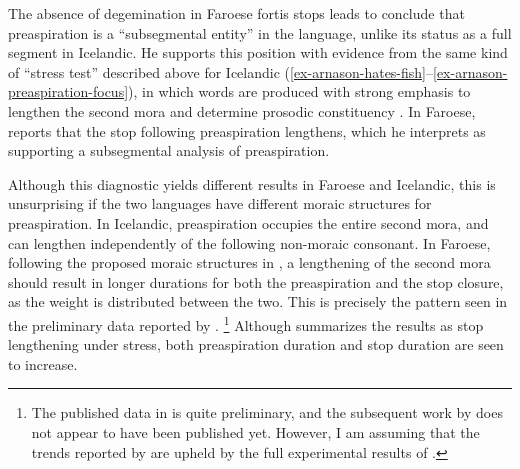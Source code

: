 \documentclass[output=paper,colorlinks,citecolor=brown]{langscibook}
\begin{document}
\begin{figure}
\hspace{3em}
\end{figure}

The absence of degemination in Faroese fortis stops leads {\citet[230]{arnason2011}} to conclude that preaspiration is a ``subsegmental entity'' in the language, unlike its status as a full segment in Icelandic. He supports this position with evidence from the same kind of ``stress test'' described above for Icelandic (\ref{ex-arnason-hates-fish}--\ref{ex-arnason-preaspiration-focus}), in which words are produced with strong emphasis to lengthen the second mora and determine prosodic constituency \citep{arnason2011,schaeferarnason2012}. In Faroese, \citet{arnason2011} reports that the stop following preaspiration lengthens, which he interprets as supporting a subsegmental analysis of preaspiration.

Although this diagnostic yields different results in Faroese and Icelandic, this is unsurprising if the two languages have different moraic structures for preaspiration. In Icelandic, preaspiration occupies the entire second mora, and can lengthen independently of the following non-moraic consonant. In Faroese, following the proposed moraic structures in , a lengthening of the second mora should result in longer durations for both the preaspiration and the stop closure, as the weight is distributed between the two. This is precisely the pattern seen in the preliminary data reported by \citet{arnason2011}.%
\footnote{The published data in \citet{arnason2011} is quite preliminary, and the subsequent work by \hbox{\citet{schaeferarnason2012}} does not appear to have been published yet. However, I am assuming that the trends reported by \citet{arnason2011} are upheld by the full experimental results of \citet{schaeferarnason2012}.} Although \citeauthor{arnason2011} summarizes the results as stop lengthening under stress, both preaspiration duration and stop duration are seen to increase. 
\end{document}
